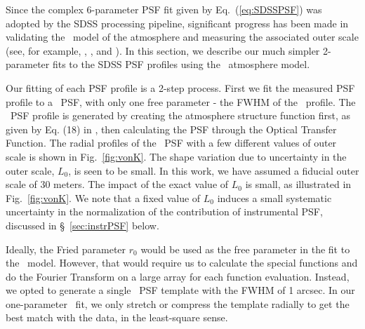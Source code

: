 

Since the complex 6-parameter PSF fit given by Eq.~(\ref{eq:SDSSPSF}) was adopted by 
the SDSS processing pipeline, significant progress has been made in validating the 
\vk~model of the atmosphere and measuring the associated outer
scale (see, for example, \citealt{Tokovinin2002}, \citealt{Boccas2004}, and \citealt{MartinezMessenger}).
In this section, we describe our much simpler 2-parameter fits to the SDSS PSF
profiles using the \vk~atmosphere model.

Our fitting of each PSF profile is a 2-step process. First we fit the
measured PSF profile to a \vk~PSF, with only one free parameter -
the FWHM of the \vk~profile.  The \vk~PSF profile is generated by creating the atmosphere
structure function first, as given by Eq. (18) in \cite{Tokovinin2002}, then calculating the
PSF through the Optical Transfer Function. 
The radial profiles of the \vk~PSF with a few different values of
outer scale is shown in Fig.~\ref{fig:vonK}.
The shape variation due to uncertainty in the outer scale, $L_0$, is seen to
be small. In this work, we have assumed a fiducial outer scale of 30 meters.
The impact of the exact value of $L_0$ is small, as illustrated in Fig.~\ref{fig:vonK}. 
We note that a fixed value of $L_0$ induces a small systematic uncertainty in 
the normalization of the contribution of instrumental PSF, discussed in \S~\ref{sec:instrPSF} 
below. 

Ideally, the Fried parameter $r_0$ would be used as the free
parameter in the fit to the \vk~model. However, 
that would require us to calculate the special functions and do the
Fourier Transform on a large array for each function evaluation.
Instead, we opted to generate a single \vk~PSF template with the FWHM of 
1 arcsec. In our one-parameter \vk~fit, we only stretch or compress
the template radially to get the best match with the data, in the
least-square sense.


